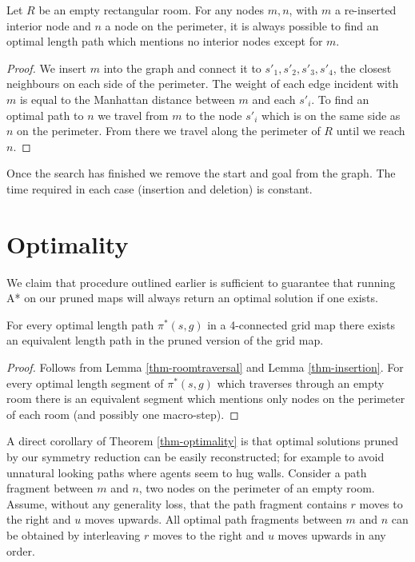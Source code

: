 \begin{lemma}
\label{thm-insertion}
Let $R$ be an empty rectangular room.
For any nodes $m, n$, with $m$ a re-inserted interior node and $n$ a node on the perimeter,
it is always possible to find an optimal length path which mentions no interior nodes except for $m$.
\end{lemma}
\begin{proof}
We insert $m$ into the graph and connect it to 
$s'_{1}, s'_{2}, s'_{3}, s'_{4}$, the closest neighbours on 
each side of the perimeter.
The weight of each edge incident with $m$ is equal to the Manhattan distance between
$m$ and each $s'_{i}$.
To find an optimal path to $n$ we travel from $m$ to the node $s'_{i}$ which is 
on the same side as $n$ on the perimeter.
From there we travel along the perimeter of $R$ until we reach $n$.
\end{proof}

Once the search has finished we remove the start and goal from the graph.
The time required in each case (insertion and deletion) is constant.

\section{Optimality}
We claim that procedure outlined earlier is sufficient to 
guarantee that running A* on our pruned maps will always return an optimal solution if one exists.

\begin{theorem}
\label{thm-optimality}
For every optimal length path $\pi^*(s, g)$ in a 4-connected grid map there exists
an equivalent length path in the pruned version of the grid map.
\end{theorem}
\begin{proof}
Follows from Lemma \ref{thm-roomtraversal} and Lemma \ref{thm-insertion}.
For every optimal length segment of $\pi^{*}(s, g)$ which traverses
through an empty room there is an equivalent segment which mentions only nodes
on the perimeter of each room (and possibly one macro-step).
\end{proof}

A direct corollary of Theorem \ref{thm-optimality} is that optimal solutions
pruned by our symmetry reduction can be easily reconstructed; for example to
avoid unnatural looking paths where agents seem to hug walls.
Consider a path fragment between $m$ and $n$, two nodes on the perimeter of an empty room.
Assume, without any generality loss, that the path fragment contains $r$ moves to the right and $u$ moves upwards.
All optimal path fragments between $m$ and $n$ can be obtained by interleaving $r$ moves to the right
and $u$ moves upwards in any order.

